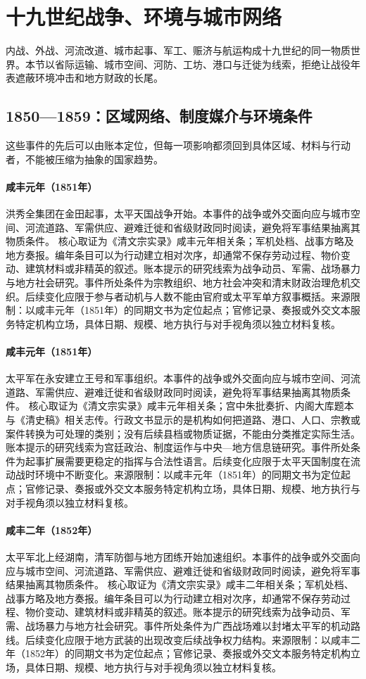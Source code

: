 \section{十九世纪战争、环境与城市网络}
内战、外战、河流改道、城市起事、军工、赈济与航运构成十九世纪的同一物质世界。本节以省际运输、城市空间、河防、工坊、港口与迁徙为线索，拒绝让战役年表遮蔽环境冲击和地方财政的长尾。
\subsection{1850—1859：区域网络、制度媒介与环境条件}
这些事件的先后可以由账本定位，但每一项影响都须回到具体区域、材料与行动者，不能被压缩为抽象的国家趋势。
\hypertarget{civic:EQ-1851-JINTIAN-UPRISING}{}\paragraph{咸丰元年（1851年）}洪秀全集团在金田起事，太平天国战争开始。本事件的战争或外交面向应与城市空间、河流道路、军需供应、避难迁徙和省级财政同时阅读，避免将军事结果抽离其物质条件。 核心取证为《清文宗实录》咸丰元年相关条；军机处档、战事方略及地方奏报。编年条目可以为行动建立相对次序，却通常不保存劳动过程、物价变动、建筑材料或非精英的叙述。账本提示的研究线索为战争动员、军需、战场暴力与地方社会研究。事件所处条件为宗教组织、地方社会冲突和清末财政治理危机交织。后续变化应限于参与者动机与人数不能由官府或太平军单方叙事概括。来源限制：以咸丰元年（1851年）的同期文书为定位起点；官修记录、奏报或外交文本服务特定机构立场，具体日期、规模、地方执行与对手视角须以独立材料复核。
\hypertarget{civic:EQ-1851-YONGAN-KINGSHIPS}{}\paragraph{咸丰元年（1851年）}太平军在永安建立王号和军事组织。本事件的战争或外交面向应与城市空间、河流道路、军需供应、避难迁徙和省级财政同时阅读，避免将军事结果抽离其物质条件。 核心取证为《清文宗实录》咸丰元年相关条；宫中朱批奏折、内阁大库题本与《清史稿》相关志传。行政文书显示的是机构如何把道路、港口、人口、宗教或案件转换为可处理的类别；没有后续县档或物质证据，不能由分类推定实际生活。账本提示的研究线索为宫廷政治、制度运作与中央—地方信息链研究。事件所处条件为起事扩展需要更稳定的指挥与合法性语言。后续变化应限于太平天国制度在流动战时环境中不断变化。来源限制：以咸丰元年（1851年）的同期文书为定位起点；官修记录、奏报或外交文本服务特定机构立场，具体日期、规模、地方执行与对手视角须以独立材料复核。
\hypertarget{civic:EQ-1852-TAIPING-NORTHWARD-MARCH}{}\paragraph{咸丰二年（1852年）}太平军北上经湖南，清军防御与地方团练开始加速组织。本事件的战争或外交面向应与城市空间、河流道路、军需供应、避难迁徙和省级财政同时阅读，避免将军事结果抽离其物质条件。 核心取证为《清文宗实录》咸丰二年相关条；军机处档、战事方略及地方奏报。编年条目可以为行动建立相对次序，却通常不保存劳动过程、物价变动、建筑材料或非精英的叙述。账本提示的研究线索为战争动员、军需、战场暴力与地方社会研究。事件所处条件为广西战场难以封堵太平军的机动路线。后续变化应限于地方武装的出现改变后续战争权力结构。来源限制：以咸丰二年（1852年）的同期文书为定位起点；官修记录、奏报或外交文本服务特定机构立场，具体日期、规模、地方执行与对手视角须以独立材料复核。
